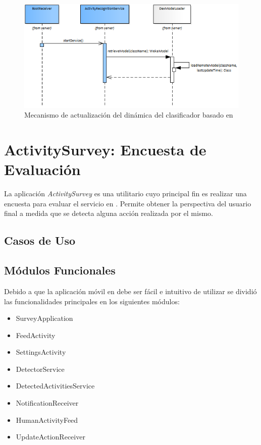 \begin{figure}
\begin{centering}
\includegraphics[width=1\columnwidth]{capitulo-5/graphics/service_classi}
\par\end{centering}
\caption[Actualización del clasificador WEKA]{\label{fig5:service-classi}Mecanismo de actualización del dinámica
del clasificador basado en }
\end{figure}


\section{ActivitySurvey: Encuesta de Evaluación}

\label{sec55:activity}La aplicación \emph{ActivitySurvey} es una
utilitario cuyo principal fin es realizar una encuesta para evaluar
el servicio  en . Permite obtener la perspectiva
del usuario final a medida que se detecta alguna acción realizada
por el mismo. 

\subsection{Casos de Uso}

\subsection{Módulos Funcionales}

Debido a que la aplicación móvil en  debe ser fácil
e intuitivo de utilizar se dividió las funcionalidades principales
en los siguientes módulos:
\begin{itemize}
\item SurveyApplication
\item FeedActivity
\item SettingsActivity
\item DetectorService
\item DetectedActivitiesService
\item NotificationReceiver
\item HumanActivityFeed
\item UpdateActionReceiver
\end{itemize}


